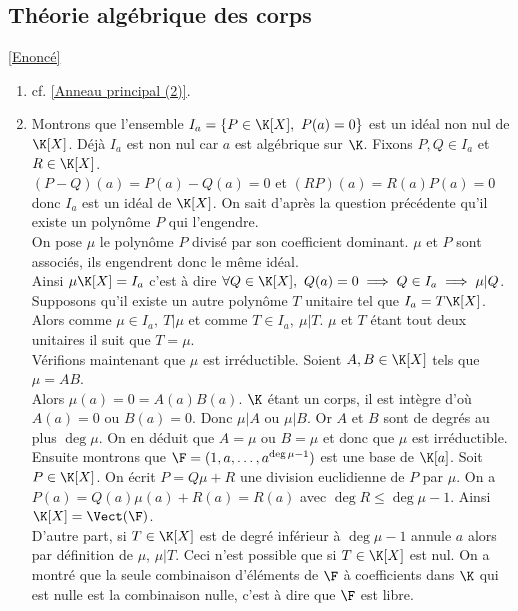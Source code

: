 \documentclass[8pt]{book}
\begin{document}
	\subsection{Théorie algébrique des corps }
	\label{Théorie algébrique des corps corrigé}
	\textcolor{blue}{\hyperref[Théorie algébrique des corps]{[Enoncé]}}\\
	\begin{enumerate}[leftmargin=*]
		\item cf. \ref{Anneau principal (2)}.
		\item Montrons que l'ensemble $I_a=\{P\in \K[X],\ P(a)=0\}$ est un idéal non nul de $\K[X]$. Déjà $I_a$ est non nul car $a$ est algébrique sur $\K$. Fixons $P,Q\in I_a$ et $R\in \K[X]$.\\
		$(P-Q)(a)=P(a)-Q(a)=0$ et $(RP)(a)=R(a)P(a)=0$ donc $I_a$ est un idéal de $\K[X]$. On sait d'après la question précédente qu'il existe un polynôme $P$ qui l'engendre.\\
		On pose $\mu$ le polynôme $P$ divisé par son coefficient dominant. $\mu$ et $P$ sont associés, ils engendrent donc le même idéal.\\
		Ainsi $\mu\K[X]=I_a$ c'est à dire $\forall Q\in \K[X],\ Q(a)=0\implies Q\in I_a\implies \mu|Q$.\\
		Supposons qu'il existe un autre polynôme $T$ unitaire tel que $I_a=T\K[X]$. Alors comme $\mu\in I_a,\ T|\mu$ et comme $T\in I_a,\ \mu|T$. $\mu$ et $T$ étant tout deux unitaires il suit que $T=\mu$.\\
		Vérifions maintenant que $\mu$ est irréductible. Soient $A,B\in \K[X]$ tels que $\mu=AB$.\\
		Alors $\mu(a)=0=A(a)B(a)$. $\K$ étant un corps, il est intègre d'où $A(a)=0$ ou $B(a)=0$. Donc $\mu|A$ ou $\mu|B$. Or $A$ et $B$ sont de degrés au plus $\deg\mu$. On en déduit que $A=\mu$ ou $B=\mu$ et donc que $\mu$ est irréductible.\\
		Ensuite montrons que $\F=(1,a,\dots,a^{\deg\mu-1})$ est une base de $\K[a]$. Soit $P\in \K[X]$. On écrit $P=Q\mu+R$ une division euclidienne de $P$ par $\mu$. On a $P(a)=Q(a)\mu(a)+R(a)=R(a)$ avec $\deg R\leq \deg\mu-1$. Ainsi $\K[X]=\Vect(\F)$.\\
		D'autre part, si $T\in \K[X]$ est de degré inférieur à $\deg\mu-1$ annule $a$ alors par définition de $\mu$, $\mu|T$. Ceci n'est possible que si $T\in \K[X]$ est nul. On a montré que la seule combinaison d'éléments de $\F$ à coefficients dans $\K$ qui est nulle est la combinaison nulle, c'est à dire que $\F$ est libre.\\

\end{enumerate}
\end{document}
